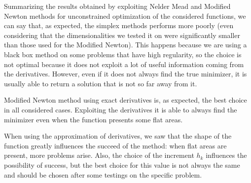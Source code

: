 Summarizing the results obtained by exploiting Nelder Mead and Modified Newton methods for 
unconstrained optimization of the considered functions, we can say that, as expected, the 
simplex methods performs more poorly (even considering that the dimensionalities we tested it 
on were significantly smaller than those used for the Modified Newton). This happens because 
we are using a black box method on some problems that have high regularity, so the choice is 
not optimal because it does not exploit a lot of useful information coming from the derivatives. 
However, even if it does not always find the true minimizer, it is usually able to return a solution 
that is not so far away from it.

Modified Newton method using exact derivatives is, as expected, the best choice in all considered cases. 
Exploiting the derivatives it is able to always find the minimizer even when the function presents 
some flat areas.

When using the approximation of derivatives, we saw that the shape of the function greatly influences the 
succeed of the method: when flat areas are present, more problems arise. Also, the choice of the increment 
$h_k$ influences the possibility of success, but the best choice for this value is not always the same 
and should be chosen after some testings on the specific problem.
